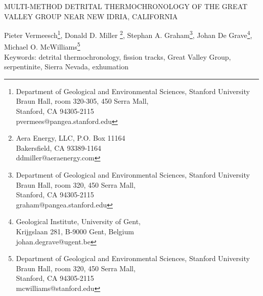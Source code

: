 \documentclass[11pt,twoside]{article}
\begin{document}
\begin{titlepage}

 \begin{center}

 \uppercase{  {\Large Multi-method  detrital  thermochronology of  the
               Great Valley Group near New Idria, California}  }

Pieter Vermeesch\footnote
{\small Department of Geological and Environmental Sciences, Stanford University\\
Braun Hall, room 320-305, 450 Serra Mall,\\
Stanford, CA 94305-2115\\ 
pvermees@pangea.stanford.edu}, 
Donald D. Miller \footnote
{\small Aera Energy, LLC, P.O. Box 11164\\ 
Bakersfield, CA 93389-1164\\
ddmiller@aeraenergy.com}, 
Stephan A. Graham\footnote
{\small Department of Geological and Environmental Sciences, Stanford University\\
Braun Hall, room 320, 450 Serra Mall,\\
Stanford, CA 94305-2115\\ 
graham@pangea.stanford.edu},
Johan De Grave\footnote
{\small Geological Institute, University of Gent,\\ 
Krijgslaan 281, B-9000 Gent, Belgium\\
johan.degrave@ugent.be},
Michael O. McWilliams\footnote
{\small Department of Geological and Environmental Sciences, Stanford University\\
Braun Hall, room 320, 450 Serra Mall,\\
Stanford, CA 94305-2115\\ 
mcwilliams@stanford.edu}\\

Keywords: detrital thermochronology, fission tracks, Great Valley Group, serpentinite, 
Sierra Nevada, exhumation

 \end{center}

 \end{titlepage}
\end{document}
